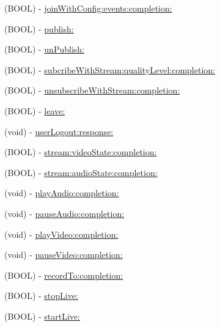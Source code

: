 \begin{DoxyCompactItemize}
\item 
(B\+O\+OL) -\/ \hyperlink{interface_c_c_streamer_basic_af1d3dce7b83deb25b77dd079f0992f67}{join\+With\+Config\+:events\+:completion\+:}
\item 
(B\+O\+OL) -\/ \hyperlink{interface_c_c_streamer_basic_a2a7f9c89eb1279f7bde5f664e333e935}{publish\+:}
\item 
(B\+O\+OL) -\/ \hyperlink{interface_c_c_streamer_basic_a9c3e78ba904db41009fe422519f91e54}{un\+Publish\+:}
\item 
(B\+O\+OL) -\/ \hyperlink{interface_c_c_streamer_basic_a10f88cc1192212c402fbf441e58f0e21}{subcribe\+With\+Stream\+:quality\+Level\+:completion\+:}
\item 
(B\+O\+OL) -\/ \hyperlink{interface_c_c_streamer_basic_a84d647ce0824c172ae3a9ee95676ccb6}{unsubscribe\+With\+Stream\+:completion\+:}
\item 
(B\+O\+OL) -\/ \hyperlink{interface_c_c_streamer_basic_ab78edee32e3ccd7b1e6d8a46b517dc38}{leave\+:}
\item 
(void) -\/ \hyperlink{interface_c_c_streamer_basic_a55bf0d02dbd791b32f53a0ea55680f04}{user\+Logout\+:response\+:}
\item 
(B\+O\+OL) -\/ \hyperlink{interface_c_c_streamer_basic_ad36a7eef2a31f2e909d3159e6ba607ce}{stream\+:video\+State\+:completion\+:}
\item 
(B\+O\+OL) -\/ \hyperlink{interface_c_c_streamer_basic_a8ccee83dc711f33ce27abb63140efab2}{stream\+:audio\+State\+:completion\+:}
\item 
(void) -\/ \hyperlink{interface_c_c_streamer_basic_a6ed3877a3e3d2a4a9cb3be32b566b261}{play\+Audio\+:completion\+:}
\item 
(void) -\/ \hyperlink{interface_c_c_streamer_basic_a78af8bc6810731775ba13a3272c6f93e}{pause\+Audio\+:completion\+:}
\item 
(void) -\/ \hyperlink{interface_c_c_streamer_basic_afe7bec4a43b1b497fec36b061c0ea090}{play\+Video\+:completion\+:}
\item 
(void) -\/ \hyperlink{interface_c_c_streamer_basic_a52ea0a4735f76f199f6d314e2cc159ad}{pause\+Video\+:completion\+:}
\item 
(B\+O\+OL) -\/ \hyperlink{interface_c_c_streamer_basic_aae5fa8e92538f309f2eac0d0bd194d2f}{record\+To\+:completion\+:}
\item 
(B\+O\+OL) -\/ \hyperlink{interface_c_c_streamer_basic_a1371108bb07a2af44edfda771ab62683}{stop\+Live\+:}
\item 
(B\+O\+OL) -\/ \hyperlink{interface_c_c_streamer_basic_ad9f91717c4dd487f254ace9a7237af4d}{start\+Live\+:}

\end{DoxyCompactItemize}

